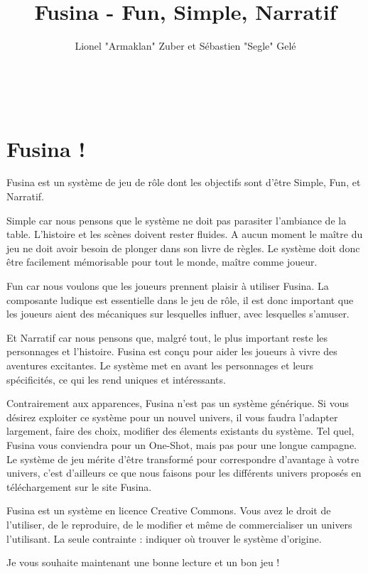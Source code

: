 \documentclass{conf/FusinaClass}
\title{Fusina - Fun, Simple, Narratif}
\author{Lionel "Armaklan" Zuber et Sébastien "Segle" Gelé}
\begin{document}
\pagestyle{couv}
    ~~\\
    \clearpage
    \pagestyle{plain}
\maketitle
\clearpage
\tableofcontents

\clearpage

\part{Fusina !}

Fusina est un système de jeu de rôle dont les objectifs sont d'être Simple, Fun, et Narratif.

Simple car nous pensons que le système ne doit pas parasiter l'ambiance de la table. L'histoire et les scènes doivent rester fluides. A aucun moment le maître du jeu ne doit avoir besoin de plonger dans son livre de règles. Le système doit donc être facilement mémorisable pour tout le monde, maître comme joueur.

Fun car nous voulons que les joueurs prennent plaisir à utiliser Fusina. La composante ludique est essentielle dans le jeu de rôle, il est donc important que les joueurs aient des mécaniques sur lesquelles influer, avec lesquelles s'amuser.

Et Narratif car nous pensons que, malgré tout, le plus important reste les personnages et l'histoire. Fusina est conçu pour aider les joueurs à vivre des aventures excitantes. Le système met en avant les personnages et leurs spécificités, ce qui les rend uniques et intéressants.

Contrairement aux apparences, Fusina n'est pas un système générique. Si vous désirez exploiter ce système pour un nouvel univers, il vous faudra l'adapter largement, faire des choix, modifier des élements existants du système. Tel quel, Fusina vous conviendra pour un One-Shot, mais pas pour une longue campagne. Le système de jeu mérite d'être transformé pour correspondre d'avantage à votre univers, c'est d'ailleurs ce que nous faisons pour les différents univers proposés en téléchargement sur le site Fusina.

Fusina est un système en licence Creative Commons. Vous avez le droit de l'utiliser, de le reproduire, de le modifier et même de commercialiser un univers l'utilisant. La seule contrainte : indiquer où trouver le système d'origine.

Je vous souhaite maintenant une bonne lecture et un bon jeu !
\end{document}
